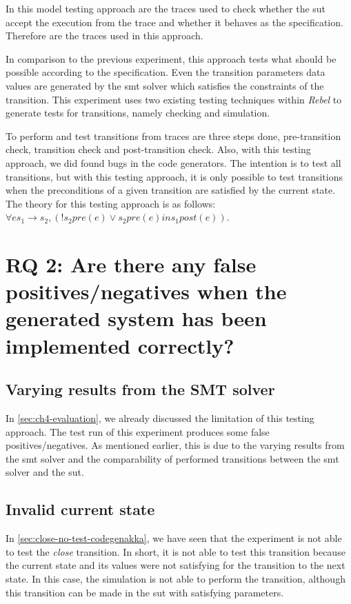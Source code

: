 In this model testing approach are the traces used to check whether the \gls{sut} accept the execution from the trace and whether it behaves as the specification. Therefore are the traces used in this approach.

In comparison to the previous experiment, this approach tests what should be possible according to the specification. Even the transition parameters data values are generated by the \gls{smt} solver which satisfies the constraints of the transition. This experiment uses two existing testing techniques within \textit{Rebel} to generate tests for transitions, namely checking and simulation.

To perform and test transitions from traces are three steps done, pre-transition check, transition check and post-transition check. Also, with this testing approach, we did found bugs in the code generators. The intention is to test all transitions, but with this testing approach, it is only possible to test transitions when the preconditions of a given transition are satisfied by the current state. The theory for this testing approach is as follows: $\forall e s_{1} \to s_{2}, (! s_{2} pre(e) \lor s_{2} pre(e) in s_{1} post(e))$.

\section{RQ 2: Are there any false positives/negatives when the generated system has been implemented correctly?}

\subsection{Varying results from the SMT solver}
In \autoref{sec:ch4-evaluation}, we already discussed the limitation of this testing approach. The test run of this experiment produces some false positives/negatives. As mentioned earlier, this is due to the varying results from the \gls{smt} solver and the comparability of performed transitions between the \gls{smt} solver and the \gls{sut}.


\subsection{Invalid current state}
In \autoref{sec:close-no-test-codegenakka}, we have seen that the experiment is not able to test the \textit{close} transition. In short, it is not able to test this transition because the current state and its values were not satisfying for the transition to the next state. In this case, the simulation is not able to perform the transition, although this transition can be made in the \gls{sut} with satisfying parameters.

